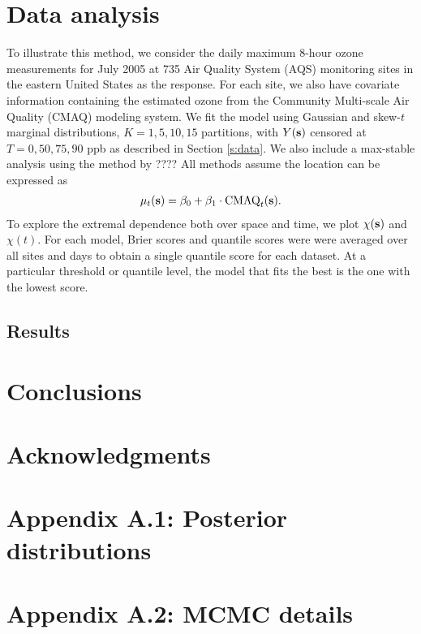 \documentclass[11pt]{article}
\begin{document}
\section{Data analysis}\label{s:analysis}
To illustrate this method, we consider the daily maximum 8-hour ozone measurements for July 2005 at 735 Air Quality System (AQS) monitoring sites in the eastern United States as the response.
For each site, we also have covariate information containing the estimated ozone from the Community Multi-scale Air Quality (CMAQ) modeling system.
We fit the model using Gaussian and skew-$t$ marginal distributions, $K=1, 5, 10, 15$ partitions, with $Y(\mbox{\bf s})$ censored at $T = 0, 50, 75, 90$ ppb as described in Section \ref{s:data}.
We also include a max-stable analysis using the method by ????
All methods assume the location can be expressed as
\begin{align}
  \mu_t(\mbox{\bf s}) = \beta_0 + \beta_1 \cdot \text{CMAQ}_t(\mbox{\bf s}).
\end{align}
To explore the extremal dependence both over space and time, we plot $\chi(\mbox{\bf s})$ and $\chi(t)$.
For each model, Brier scores and quantile scores were were averaged over all sites and days to obtain a single quantile score for each dataset.
At a particular threshold or quantile level, the model that fits the best is the one with the lowest score.

\subsection{Results}\label{s:results}

\section{Conclusions}\label{s:con}

\section*{Acknowledgments}

\section*{Appendix A.1: Posterior distributions}





\section*{Appendix A.2: MCMC details}
\end{document}
